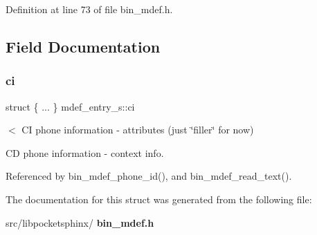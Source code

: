 Definition at line 73 of file bin\+\_\+mdef.\+h.



\subsection{Field Documentation}
\mbox{\label{structmdef__entry__s_a24e5db7af5e705b310e82154055043ec}} 
\subsubsection{ci}
{\footnotesize\ttfamily struct \{ ... \}   mdef\+\_\+entry\+\_\+s\+::ci}



$<$ CI phone information -\/ attributes (just \char`\"{}filler\char`\"{} for now) 

CD phone information -\/ context info. 

Referenced by bin\+\_\+mdef\+\_\+phone\+\_\+id(), and bin\+\_\+mdef\+\_\+read\+\_\+text().



The documentation for this struct was generated from the following file\+:\begin{DoxyCompactItemize}
\item 
src/libpocketsphinx/\textbf{ bin\+\_\+mdef.\+h}\end{DoxyCompactItemize}
